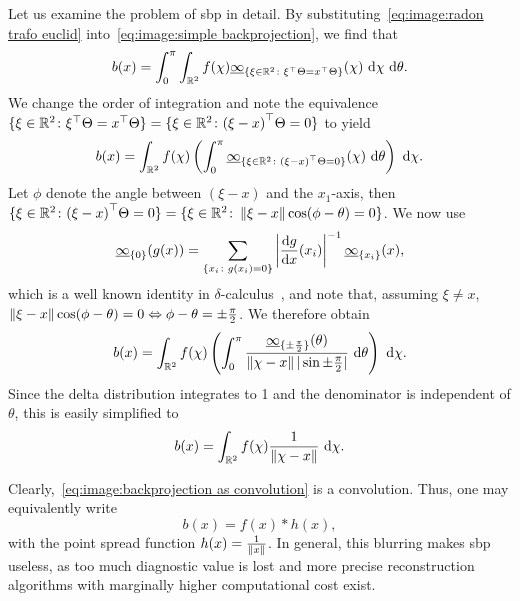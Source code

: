 \documentclass[../ml-ct.tex]{subfiles}
\begin{document}
Let us examine the problem of \gls{sbp} in detail.
By substituting~\cref{eq:image:radon trafo euclid} into~\cref{eq:image:simple backprojection}, we find that
\begin{equation}
	b(x) = \int_0^\pi \int_{\mathbb{R}^2} f(\chi) \underline{\infty}_{\{\xi \in \mathbb{R}^2 \colon \xi^\top \Theta = x^\top\Theta\}}(\chi)\ \mathrm{d} \chi\ \mathrm{d} \theta.
\end{equation}
We change the order of integration and note the equivalence \( \{\xi\in\mathbb{R}^2\colon\xi^\top\Theta = x^\top\Theta \} = \{ \xi\in\mathbb{R}^2 \colon {(\xi - x)}^\top\Theta = 0 \} \) to yield
\begin{equation}
	b(x) = \int_{\mathbb{R}^2} f(\chi) \left( \int_0^\pi \underline{\infty}_{\{\xi\in\mathbb{R}^2\colon{(\xi - x )}^\top\Theta = 0\}}(\chi)\ \mathrm{d}\theta \right)\ \mathrm{d} \chi.
\end{equation}
Let \( \phi \) denote the angle between \( (\xi - x) \) and the \( x_1 \)-axis, then \( \{\xi\in\mathbb{R}^2\colon{(\xi - x )}^\top\Theta = 0\} = \{\xi\in\mathbb{R}^2\colon \left\lVert\xi - x\right\rVert\cos(\phi - \theta) = 0\} \).
We now use
\begin{equation}
	\underline{\infty}_{\{0\}}(g(x)) = \sum_{\{x_i\colon g(x_i) = 0\}} \left\vert\frac{\mathrm{d} g}{\mathrm{d} x}(x_i)\right\vert^{-1} \underline{\infty}_{\{ x_i \}}(x),
\end{equation}
which is a well known identity in \(\delta\)-calculus~\cite{bracewell_fourier_1986}, and note that, assuming \( \xi \neq x \), \( \left\lVert\xi - x\right\rVert\cos(\phi - \theta) = 0 \Leftrightarrow \phi - \theta = \pm\frac{\pi}{2} \).
We therefore obtain
\begin{equation}
	b(x) = \int_{\mathbb{R}^2} f(\chi) \left( \int_0^\pi \frac{\underline{\infty}_{\{\pm\frac{\pi}{2}\}}(\theta)}{\left\lVert\chi - x\right\rVert|\sin\pm\frac{\pi}{2}|}\ \mathrm{d} \theta \right)\ \mathrm{d} \chi.
\end{equation}
Since the delta distribution integrates to \num{1} and the denominator is independent of \( \theta \), this is easily simplified to
\begin{equation}
	b(x) = \int_{\R^2} f(\chi) \frac{1}{\norm{\chi - x}}\ \dd \chi.%
	\label{eq:image:backprojection as convolution}
\end{equation}

Clearly,~\cref{eq:image:backprojection as convolution} is a convolution.
Thus, one may equivalently write
\begin{equation}
	b(x) = f(x) * h(x),
\end{equation}
with the point spread function \( h(x) = \frac{1}{\left\lVert x\right\rVert} \).
In general, this blurring makes \gls{sbp} useless, as too much diagnostic value is lost and more precise reconstruction algorithms with marginally higher computational cost exist.
\end{document}
